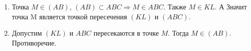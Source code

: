 \begin{enumerate}
\item Точка $M\in (AB)$, $(AB)\subset ABC \Rightarrow M\in ABC$. Также $M\in KL$. А Значит точка M является точкой пересечения $(KL)$ и $(ABC)$.
\item Допустим $(KL)$ и $ABC$ пересекаются в точке $M$. Тогда $M\in (AB)$. Противоречие.
\end{enumerate}
